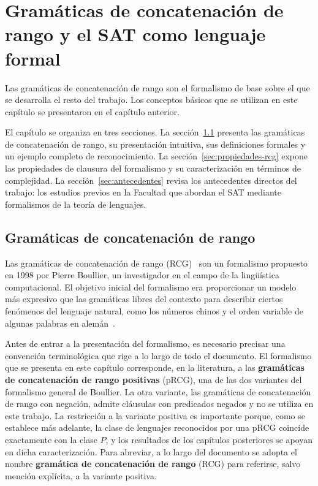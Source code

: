 \documentclass{report}
\theoremstyle{definition}
\theoremstyle{plain}
\theoremstyle{remark}
\begin{document}
\setcounter{chapter}{1}
\chapter{Gramáticas de concatenación de rango y el SAT como lenguaje formal}
\label{cap:rcg-sat}

Las gramáticas de concatenación de rango son el formalismo de base
sobre el que se desarrolla el resto del trabajo. Los conceptos básicos
que se utilizan en este capítulo se presentaron en el capítulo
anterior.

El capítulo se organiza en tres secciones. La sección~\ref{sec:rcg}
presenta las gramáticas de concatenación de rango, su presentación
intuitiva, sus definiciones formales y un ejemplo completo de
reconocimiento. La sección~\ref{sec:propiedades-rcg} expone las
propiedades de clausura del formalismo y su caracterización en
términos de complejidad. La sección~\ref{sec:antecedentes} revisa los
antecedentes directos del trabajo: los estudios previos en la Facultad
que abordan el SAT mediante formalismos de la teoría de lenguajes.

\section{Gramáticas de concatenación de rango}
\label{sec:rcg}

Las gramáticas de concatenación de rango (RCG)~\cite{boullier1998proposal}
son un formalismo propuesto en 1998 por Pierre Boullier, un investigador
en el campo de la lingüística computacional. El objetivo inicial del
formalismo era proporcionar un modelo más expresivo que las gramáticas
libres del contexto para describir ciertos fenómenos del lenguaje
natural, como los números chinos y el orden variable de algunas palabras
en alemán~\cite{boullier1999chinese}.

Antes de entrar a la presentación del formalismo, es necesario precisar
una convención terminológica que rige a lo largo de todo el documento.
El formalismo que se presenta en este capítulo corresponde, en la
literatura, a las \textbf{gramáticas de concatenación de rango
positivas} (pRCG), una de las dos variantes del formalismo general de
Boullier. La otra variante, las gramáticas de concatenación de rango con
negación, admite cláusulas con predicados negados y no se utiliza en
este trabajo. La restricción a la variante positiva es importante
porque, como se establece más adelante, la clase de lenguajes
reconocidos por una pRCG coincide exactamente con la clase $P$, y
los resultados de los capítulos posteriores se apoyan en dicha
caracterización. Para abreviar, a lo largo del documento se adopta el
nombre \textbf{gramática de concatenación de rango} (RCG) para
referirse, salvo mención explícita, a la variante positiva.
\end{document}
